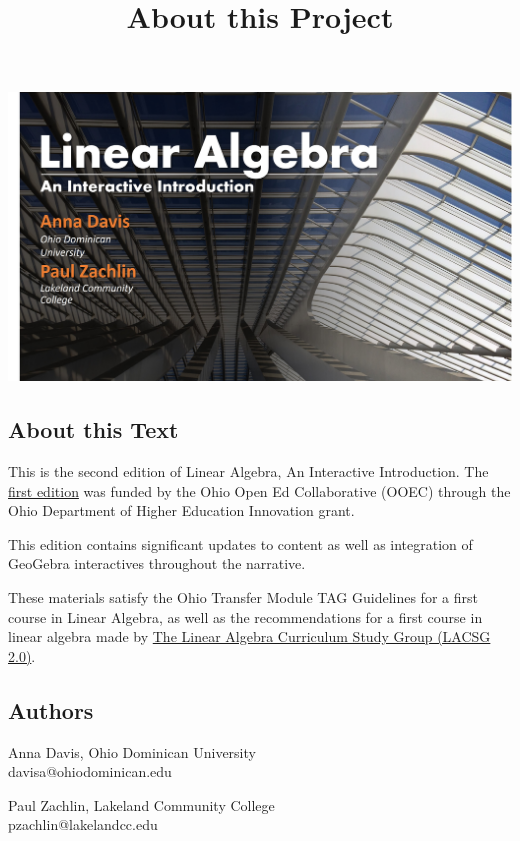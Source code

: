 \documentclass{ximera}
\title{About this Project} \license{CC BY-NC-SA 4.0}
\begin{document}
\begin{abstract}
\end{abstract}
\maketitle

\begin{image}
\includegraphics{BookCover1.jpg}
\end{image}

\subsection{About this Text}
This is the second edition of Linear Algebra, An Interactive Introduction.  The \href{https://ximera.osu.edu/la/LinearAlgebra}{first edition} was funded by the Ohio Open Ed Collaborative (OOEC) through the Ohio Department of Higher Education Innovation grant. 

This edition contains significant updates to content as well as integration of GeoGebra interactives throughout the narrative.

These materials satisfy the Ohio Transfer Module TAG Guidelines for a first course in Linear Algebra, as well as the recommendations for a first course in linear algebra made by \href{https://dx.doi.org/10.1090/noti2479}{The Linear Algebra Curriculum Study Group (LACSG 2.0)}.  

\subsection{Authors}
Anna Davis, Ohio Dominican University\\
davisa@ohiodominican.edu

Paul Zachlin, Lakeland Community College\\
pzachlin@lakelandcc.edu
\end{document}

